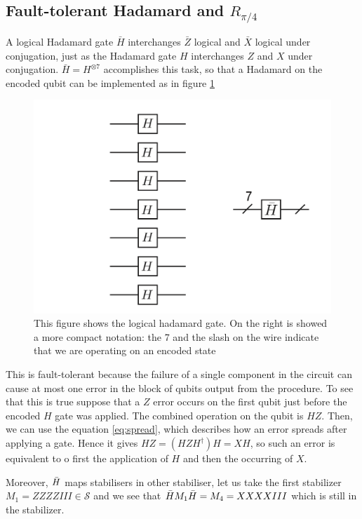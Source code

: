 \subsection*{Fault-tolerant Hadamard and $R_{\pi/4}$}
A logical Hadamard gate $\bar{H}$ interchanges $\bar{Z}$ logical and $\bar{X}$ logical under conjugation, just as the Hadamard gate $H$ interchanges $Z$ and $X$ under conjugation. $\bar{H}= H^{\otimes 7}$ accomplishes this task, so that a Hadamard on the encoded qubit can be implemented as in figure \ref{fig:logHada}
\begin{figure}[h!]
    \centering
    \includegraphics[scale=0.5]{Mainmatter/images/LogicalHadamard.png}
    \caption{This figure shows the logical hadamard gate. On the right is showed a more compact notation: the 7 and the slash on the wire indicate that we are operating on an encoded state}
    \label{fig:logHada}
\end{figure}

This is fault-tolerant because the failure of a single component in the circuit can cause at most one error in the block of qubits output from the procedure. To see that this is true suppose that a $Z$ error occurs on the first qubit just before the encoded $H$ gate was applied. The combined operation on the qubit is $H Z$. Then, we can use the equation \ref{eq:spread}, which describes how an error spreads after applying a gate. Hence it gives $H Z =(H Z H^{\dagger})H=X H$, so such an error is equivalent to o first the application of $H$ and then the occurring of $X$.

Moreover, $\Bar{H}$ maps stabilisers in other stabiliser, let us take the first stabilizer $M_1=ZZZZIII \in \mathcal{S}$ and we see that $\Bar{H} M_1 \Bar{H} = M_4 =XXXXIII $ which is still in the stabilizer. 

